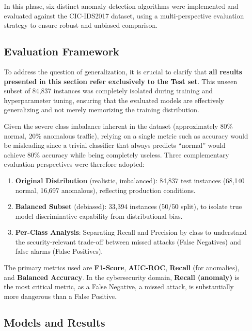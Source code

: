 \documentclass[11pt]{article}
\begin{document}
In this phase, six distinct anomaly detection algorithms were implemented and evaluated against the CIC-IDS2017 dataset, using a multi-perspective evaluation strategy to ensure robust and unbiased comparison.

\subsection{Evaluation Framework}

To address the question of generalization, it is crucial to clarify that \textbf{all results presented in this section refer exclusively to the Test set}. This unseen subset of 84,837 instances was completely isolated during training and hyperparameter tuning, ensuring that the evaluated models are effectively generalizing and not merely memorizing the training distribution.

Given the severe class imbalance inherent in the dataset (approximately 80\% normal, 20\% anomalous traffic), relying on a single metric such as accuracy would be misleading since a trivial classifier that always predicts ``normal'' would achieve 80\% accuracy while being completely useless. Three complementary evaluation perspectives were therefore adopted:

\begin{enumerate}
    \item \textbf{Original Distribution} (realistic, imbalanced): 84,837 test instances (68,140 normal, 16,697 anomalous), reflecting production conditions.
    \item \textbf{Balanced Subset} (debiased): 33,394 instances (50/50 split), to isolate true model discriminative capability from distributional bias.
    \item \textbf{Per-Class Analysis}: Separating Recall and Precision by class to understand the security-relevant trade-off between missed attacks (False Negatives) and false alarms (False Positives).
\end{enumerate}

The primary metrics used are \textbf{F1-Score}, \textbf{AUC-ROC}, \textbf{Recall} (for anomalies), and \textbf{Balanced Accuracy}. In the cybersecurity domain, \textbf{Recall (anomaly)} is the most critical metric, as a False Negative, a missed attack, is substantially more dangerous than a False Positive.

\subsection{Models and Results}
\end{document}
